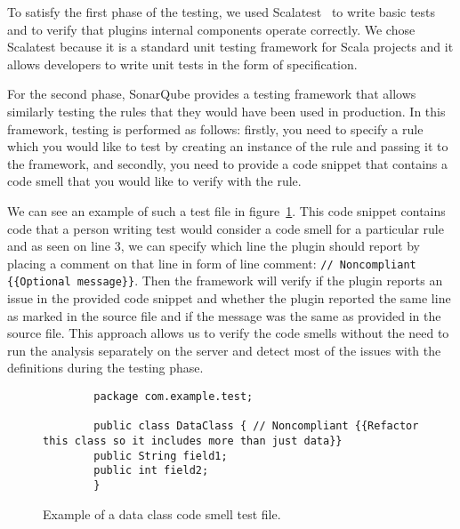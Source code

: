 To satisfy the first phase of the testing, we used Scalatest~\cite{scalatest} to write basic tests and to verify
that plugins internal components operate correctly.
We chose Scalatest because it is a standard unit testing framework for Scala projects and it allows developers
to write unit tests in the form of specification.

For the second phase, SonarQube provides a testing framework that allows similarly testing the rules that
they would have been used in production.
In this framework, testing is performed as follows: firstly, you need to specify a rule which you would like to test by
creating an instance of the rule and passing it to the framework, and secondly, you need to provide a code snippet that
contains a code smell that you would like to verify with the rule.

We can see an example of such a test file in figure~\ref{data_class_example}.
This code snippet contains code that a person writing test would consider a code smell for a particular rule
and as seen on line 3, we can specify which line the plugin should report by placing a comment on that line in form of line comment:
\verb|// Noncompliant {{Optional message}}|.
Then the framework will verify if the plugin reports an issue in the provided code snippet and whether the plugin reported
the same line as marked in the source file and if the message was the same as provided in the source file.
This approach allows us to verify the code smells without the need to run the analysis separately on the server and
detect most of the issues with the definitions during the testing phase.

\begin{figure} [htb]
    \begin{lstlisting}
        package com.example.test;

        public class DataClass { // Noncompliant {{Refactor this class so it includes more than just data}}
        public String field1;
        public int field2;
        }
    \end{lstlisting}
    \caption{Example of a data class code smell test file.}
    \label{data_class_example}
\end{figure}
